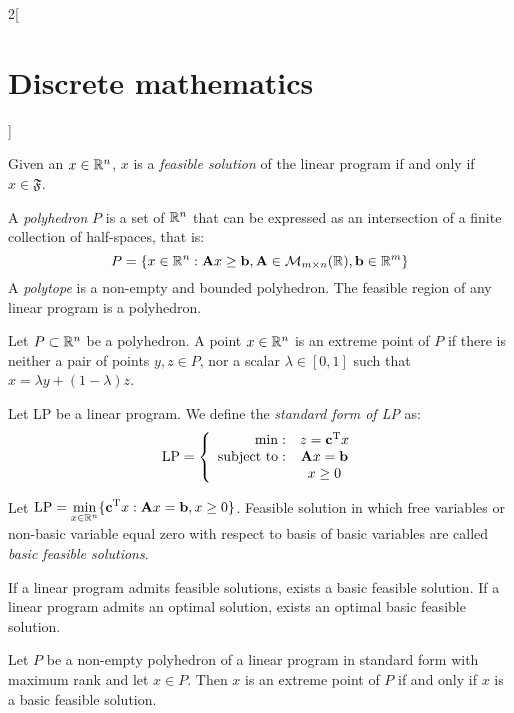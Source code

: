 \documentclass[../../../main.tex]{subfiles}
\begin{document}
\begin{multicols}{2}[\section{Discrete mathematics}]
\begin{definition}
    \end{definition}
    \begin{prop}
        Given an $x\in\mathbb{R} ^n$, $x$ is a \textit{feasible solution} of the linear program if and only if $x\in\mathfrak{F}$.
    \end{prop}
    \begin{definition}
        A \textit{polyhedron} $P$ is a set of $\mathbb{R} ^n$ that can be expressed as an intersection of a finite collection of half-spaces, that is: $$P=\{x\in\mathbb{R} ^n:\boldsymbol{\mathrm{A}}x\geq \boldsymbol{\mathrm{b}}, \boldsymbol{\mathrm{A}}\in\mathcal{M}_{m\times n}(\mathbb{R} ),\boldsymbol{\mathrm{b}}\in\mathbb{R} ^m\}$$ A \textit{polytope} is a non-empty and bounded polyhedron. The feasible region of any linear program is a polyhedron.
    \end{definition}
    \begin{definition}
        Let $P\subset\mathbb{R} ^n$ be a polyhedron. A point $x\in\mathbb{R} ^n$ is an extreme point of $P$ if there is neither a pair of points $y,z\in P$, nor a scalar $\lambda\in[0,1]$ such that $x=\lambda y+(1-\lambda)z$.
    \end{definition}
    \begin{definition}
        Let LP be a linear program. We define the \textit{standard form of LP} as:
        $$\text{LP}=\left\{
            \begin{array}{rc}
                \min:              & z=\vb{c}^{\mathrm{T}}x \\
                \text{subject to}: & \boldsymbol{\mathrm{A}}x=\boldsymbol{\mathrm{b}}   \\
                                   & x\geq 0
            \end{array}\right.$$
    \end{definition}
    \begin{definition}
        Let $\displaystyle \text{LP}=\min_{x\in\mathbb{R} ^n}\{\vb{c}^{\mathrm{T}}x:\boldsymbol{\mathrm{A}}x=\boldsymbol{\mathrm{b}},x\geq 0\}$. Feasible solution in which free variables or non-basic variable equal zero with respect to basis of basic variables are called \textit{basic feasible solutions}.
    \end{definition}
    \begin{prop}
        If a linear program admits feasible solutions, exists a basic feasible solution. If a linear program admits an optimal solution, exists an optimal basic feasible solution.
    \end{prop}
    \begin{theorem}
        Let $P$ be a non-empty polyhedron of a linear program in standard form with maximum rank and let $x\in P$. Then $x$ is an extreme point of $P$ if and only if $x$ is a basic feasible solution.

\end{theorem}
\end{multicols}
\end{document}
